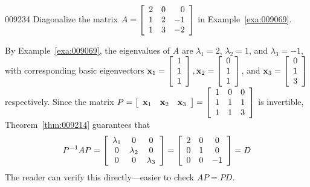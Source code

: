 \begin{example}{}{009234}
Diagonalize the matrix $A = \left[ \begin{array}{rrr}
2 & 0 & 0 \\
1 & 2 & -1 \\
1 & 3 & -2 
\end{array}\right]$
 in Example~\ref{exa:009069}.


\begin{solution}
  By Example~\ref{exa:009069}, the eigenvalues of $A$ are $\lambda_{1} = 2$, $\lambda_{2} = 1$, and $\lambda_{3} = -1$, with corresponding basic eigenvectors $\textbf{x}_1 = \left[ \begin{array}{r}
1 \\
1 \\
1
\end{array}\right], \textbf{x}_2 = \left[ \begin{array}{r}
0 \\
1 \\
1
\end{array}\right]$, 
 and $\textbf{x}_3 = \left[ \begin{array}{r}
0 \\
1 \\
3
\end{array}\right]$ 
 respectively. Since the matrix $P= \left[ \begin{array}{cccc}
\textbf{x}_1 & \textbf{x}_2 & \textbf{x}_3 \end{array}\right] = \left[ \begin{array}{rrr}
1 & 0 & 0 \\
1 & 1 & 1 \\
1 & 1 & 3
\end{array}\right]$
 is invertible, Theorem~\ref{thm:009214} guarantees that 
\begin{equation*}
P^{-1} AP = \left[ \begin{array}{ccc}
\lambda_1 & 0 & 0 \\
0 & \lambda_2 & 0 \\
0 & 0 & \lambda_3 
\end{array}\right] = \left[ \begin{array}{ccc}
2 & 0 & 0 \\
0 & 1 & 0 \\
0 & 0 & -1 
\end{array}\right]
=D
\end{equation*}
The reader can verify this directly---easier to check $AP = PD$.
\end{solution}
\end{example}

